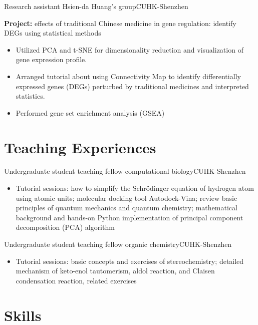 \documentclass[12pt,a4paper,sans]{moderncv}
\newcommand\linksymbol{\scriptsize\faExternalLink*}
\newcommand{\cvsection}[1]{\section{{#1}}}
\begin{document}
{Research assistant}{}
{Hsien-da Huang's group}{CUHK-Shenzhen}
{\small
    \textbf{Project:} effects of traditional Chinese medicine in gene regulation:
    identify DEGs using statistical methods
    \begin{itemize}[itemsep=4pt]
        \item Utilized PCA and t-SNE for dimensionality reduction and visualization of gene expression profile.
        \item Arranged tutorial about using Connectivity Map to identify differentially expressed genes (DEGs) perturbed by
        traditional medicines and interpreted statistics.
        \item Performed gene set enrichment analysis (GSEA)
    \end{itemize}
}
\newpage
\cvsection{Teaching Experiences}
{Undergraduate student teaching fellow}{}
{computational biology}{CUHK-Shenzhen}
{
    \begin{itemize}[itemsep=2pt]
        \item Tutorial sessions: how to simplify the 
        Schrödinger equation of hydrogen atom using
        atomic units; molecular docking tool Autodock-Vina;
        review basic principles of quantum mechanics and quantum chemistry;
        mathematical background and hands-on Python implementation of principal component decomposition (PCA) algorithm
        \href{https://github.com/haoran0115/pca-implementation}{\linksymbol}
    \end{itemize}
}
{Undergraduate student teaching fellow}{}
{organic chemistry}{CUHK-Shenzhen}
{
    \begin{itemize}[itemsep=2pt]
        \item Tutorial sessions: basic concepts and exercises of stereochemistry;
        detailed mechanism of keto-enol tautomerism, aldol reaction,
        and Claisen condensation reaction, related exercises
    \end{itemize}
}

\cvsection{Skills}
\end{document}

